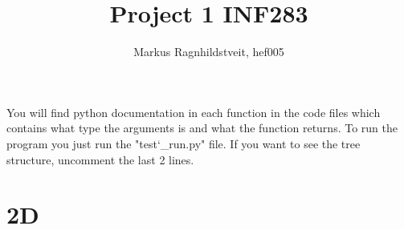 \documentclass[a4paper]{extarticle}
\title{Project 1 INF283}
\author{Markus Ragnhildstveit, hef005}
\begin{document}
\maketitle

\tableofcontents
\newpage
You will find python documentation in each function in the code files which contains what type the arguments is and what the function returns. To run the program you just run the "test\char`_run.py" file. If you want to see the tree structure, uncomment the last 2 lines.

\section{2D}
\
\end{document}
